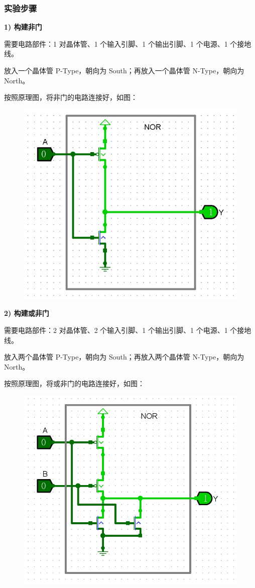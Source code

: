 \documentclass[UTF8]{ctexart}
\begin{document}
\subsubsection{实验步骤}


\textbf{1) 构建非门}

需要电路部件：1 对晶体管、1 个输入引脚、1 个输出引脚、1 个电源、1 个接地线。

放入一个晶体管 P-Type，朝向为 South；再放入一个晶体管 N-Type，朝向为 North。

按照原理图，将非门的电路连接好，如图：

\begin{figure}[H]
    \centering
    \includegraphics[width = .6\textwidth]{images/not.jpg}
\end{figure}


\textbf{2) 构建或非门}

需要电路部件：2 对晶体管、2 个输入引脚、1 个输出引脚、1 个电源、1 个接地线。

放入两个晶体管 P-Type，朝向为 South；再放入两个晶体管 N-Type，朝向为 North。

按照原理图，将或非门的电路连接好，如图：

\begin{figure}[H]
    \centering
    \includegraphics[width = .6\textwidth]{images/nor.jpg}
\end{figure}
\end{document}

